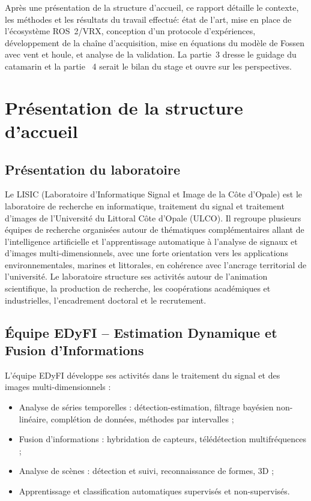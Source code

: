 \documentclass{rapportEILCO}
\begin{document}
	Après une présentation de la structure d'accueil, ce rapport détaille le contexte, les méthodes et les résultats du travail effectué: état de l'art, mise en place de l'écosystème ROS~2/VRX, conception d'un protocole d'expériences, développement de la chaîne d'acquisition, mise en équations du modèle de Fossen avec vent et houle, et analyse de la validation. La partie~3 dresse le guidage du catamarin et la partie ~4 serait le bilan du stage et ouvre sur les perspectives.
	
	\section{Présentation de la structure d'accueil}
	
	
	\subsection{Présentation du laboratoire}
	Le LISIC (Laboratoire d'Informatique Signal et Image de la Côte d'Opale) est le laboratoire de recherche en informatique, traitement du signal et traitement d'images de l'Université du Littoral Côte d'Opale (ULCO). Il regroupe plusieurs équipes de recherche organisées autour de thématiques complémentaires allant de l'intelligence artificielle et l'apprentissage automatique à l'analyse de signaux et d'images multi-dimensionnels, avec une forte orientation vers les applications environnementales, marines et littorales, en cohérence avec l'ancrage territorial de l'université. Le laboratoire structure ses activités autour de l'animation scientifique, la production de recherche, les coopérations académiques et industrielles, l'encadrement doctoral et le recrutement.
	
	\subsection{Équipe EDyFI -- Estimation Dynamique et Fusion d'Informations}
	L'équipe EDyFI développe ses activités dans le traitement du signal et des images multi-dimensionnels :
	\begin{itemize}[label=--]
		\item Analyse de séries temporelles : détection-estimation, filtrage bayésien non-linéaire, complétion de données, méthodes par intervalles ;
		\item Fusion d'informations : hybridation de capteurs, télédétection multifréquences ;
		\item Analyse de scènes : détection et suivi, reconnaissance de formes, 3D ;
		\item Apprentissage et classification automatiques supervisés et non-supervisés.
	\end{itemize}
	
\end{document}
